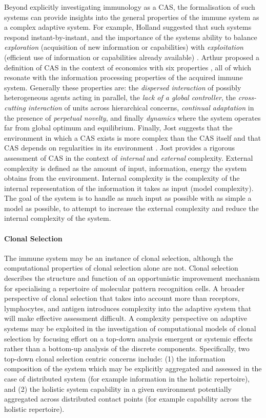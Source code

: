 Beyond explicitly investigating immunology as a CAS, the formalisation of such systems can provide insights into the general properties of the immune system as a complex adaptive system.
For example, Holland suggested that such systems respond instant-by-instant, and the importance of the systems ability to balance \emph{exploration} (acquisition of new information or capabilities) with \emph{exploitation} (efficient use of information or capabilities already available) \cite{Holland1992a}.
Arthur proposed a definition of CAS in the context of economics with six properties \cite{Arthur1997}, all of which resonate with the information processing properties of the acquired immune system. Generally these properties are: the \emph{dispersed interaction} of possibly heterogeneous agents acting in parallel, the \emph{lack of a global controller}, the \emph{cross-cutting interaction} of units across hierarchical concerns, \emph{continual adaptation} in the presence of \emph{perpetual novelty}, and finally \emph{dynamics} where the system operates far from global optimum and equilibrium. 
Finally, Jost suggests that the environment in which a CAS exists is more complex than the CAS itself and that CAS depends on regularities in its environment \cite{Jost2004}. Jost provides a rigorous assessment of CAS in the context of \emph{internal} and \emph{external} complexity. External complexity is defined as the amount of input, information, energy the system obtains from the environment. Internal complexity is the complexity of the internal representation of the information it takes as input (model complexity). The goal of the system is to handle as much input as possible with as simple a model as possible, to attempt to increase the external complexity and reduce the internal complexity of the system.

%
%
\paragraph{Clonal Selection}
The immune system may be an instance of clonal selection, although the computational properties of clonal selection alone are not. Clonal selection describes the structure and function of an opportunistic improvement mechanism for specialising a repertoire of molecular pattern recognition cells. A broader perspective of clonal selection that takes into account more than receptors, lymphocytes, and antigen introduces complexity into the adaptive system that will make effective assessment difficult. 
A complexity perspective on adaptive systems may be exploited in the investigation of computational models of clonal selection by focusing effort on a top-down analysis emergent or systemic effects rather than a bottom-up analysis of the discrete components. Specifically, two top-down clonal selection centric concerns include: (1) the information composition of the system which may be explicitly aggregated and assessed in the case of distributed system (for example information in the holistic repertoire), and (2) the holistic system capability in a given environment potentially aggregated across distributed contact points (for example capability across the holistic repertoire). 


